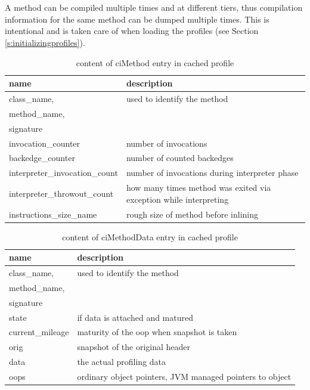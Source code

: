 \\\\
A method can be compiled multiple times and at different tiers, thus compilation information for the same method can be dumped multiple times. This is intentional and is taken care of when loading the profiles (see Section \ref{s:initializingprofiles}).
\begin{table}[ht!]
  \caption{content of ciMethod entry in cached profile}
  \label{t:cimethod}
  \begin{center}
    \begin{tabular}{|p{5cm}|p{10.5cm}|} 
      \hline
       \textbf{name} & \textbf{description} \\ \hline\hline
       class\_name,& used to identify the method\\
       method\_name, & \\
       signature & \\ \hline
       invocation\_counter & number of invocations\\ \hline
       backedge\_counter & number of counted backedges\\ \hline
       interpreter\_invocation\_count & number of invocations during interpreter phase\\ \hline
       interpreter\_throwout\_count & how many times method was exited via exception while interpreting\\ \hline
       instructions\_size\_name & rough size of method before inlining\\ \hline
    \end{tabular}
  \end{center}
\end{table}
\begin{table}[ht!]
  \caption{content of ciMethodData entry in cached profile}
  \label{t:cimethoddata}
  \begin{center}
    \begin{tabular}{|p{5cm}|p{10.5cm}|} 
      \hline
       \textbf{name} & \textbf{description} \\ \hline\hline
       class\_name,& used to identify the method\\
       method\_name, & \\
       signature & \\ \hline
       state & if data is attached and matured\\ \hline
       current\_mileage & maturity of the oop when snapshot is taken\\ \hline
       orig &  snapshot of the original header\\ \hline
       data & the actual profiling data\\ \hline
       oops & ordinary object pointers, JVM managed pointers to object\\ \hline        
    \end{tabular}
  \end{center}
\end{table}
